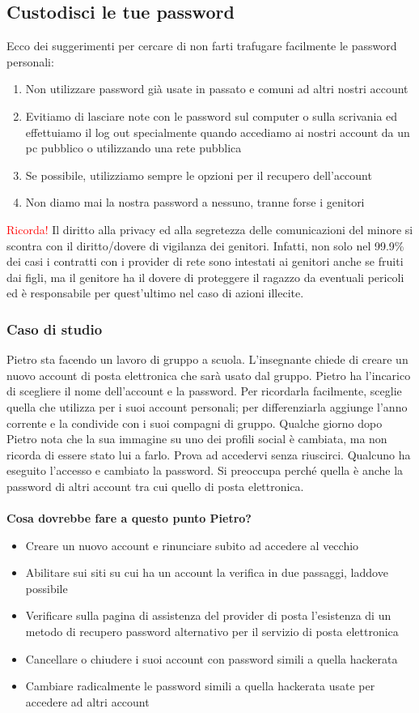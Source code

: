 \documentclass{article}
\begin{document}
\subsection{Custodisci le tue password}
Ecco dei suggerimenti per cercare di non farti trafugare facilmente le password personali:
\begin{enumerate}
	\item Non utilizzare password già usate in passato e comuni ad altri nostri account
	\item Evitiamo di lasciare note con le password sul computer o sulla scrivania ed effettuiamo il log out specialmente quando accediamo ai nostri account da un pc pubblico o utilizzando una rete pubblica
	\item Se possibile, utilizziamo sempre le opzioni per il recupero dell'account
	\item Non diamo mai la nostra password a nessuno, tranne forse i genitori
\end{enumerate}
\textcolor{red}{Ricorda!} Il diritto alla privacy ed alla segretezza delle comunicazioni del minore si scontra con il diritto/dovere di vigilanza dei genitori. Infatti, non solo nel 99.9\% dei casi i contratti con i provider di rete sono intestati ai genitori anche se fruiti dai figli, ma il genitore ha il dovere di proteggere il ragazzo da eventuali pericoli ed è responsabile per quest’ultimo nel caso di azioni illecite.
\subsubsection{Caso di studio}
\label{sec:Caso15}
Pietro sta facendo un lavoro di gruppo a scuola. L’insegnante chiede di creare un nuovo account di posta elettronica che sarà usato dal gruppo. Pietro ha l’incarico di scegliere il nome dell’account e la password. Per ricordarla facilmente, sceglie quella che utilizza per i suoi account personali; per differenziarla aggiunge l’anno corrente e la condivide con i suoi compagni di gruppo. Qualche giorno dopo Pietro nota che la sua immagine su uno dei profili social è cambiata, ma non ricorda di essere stato lui a farlo. Prova ad accedervi senza riuscirci. Qualcuno ha eseguito l’accesso e cambiato la password. Si preoccupa perché quella è anche la password di altri account tra cui quello di posta elettronica.
\\\vspace{5mm}\\
\textbf{Cosa dovrebbe fare a questo punto Pietro?}
\begin{itemize}
	\item Creare un nuovo account e rinunciare subito ad accedere al vecchio		
	\item Abilitare sui siti su cui ha un account la verifica in due passaggi, laddove possibile
	\item Verificare sulla pagina di assistenza del provider di posta l’esistenza di un metodo di recupero password alternativo per il servizio di posta elettronica
	\item Cancellare o chiudere i suoi account con password simili a quella hackerata
	\item Cambiare radicalmente le password simili a quella hackerata usate per accedere ad altri account
\end{itemize}
\end{document}
